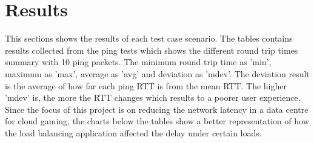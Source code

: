 \clearpage
\section{Results}

This sections shows the results of each test case scenario. The tables contains results collected from the ping tests which shows the different round trip times summary with 10 ping packets. The minimum round trip time as 'min', maximum as 'max', average as 'avg' and deviation as 'mdev'. The deviation result is the average of how far each ping RTT is from the mean RTT. The higher 'mdev' is, the more the RTT changes which results to a poorer user experience. Since the focus of this project is on reducing the network latency in a data centre for cloud gaming, the charts below the tables show a better representation of how the load balancing application affected the delay under certain loads.

